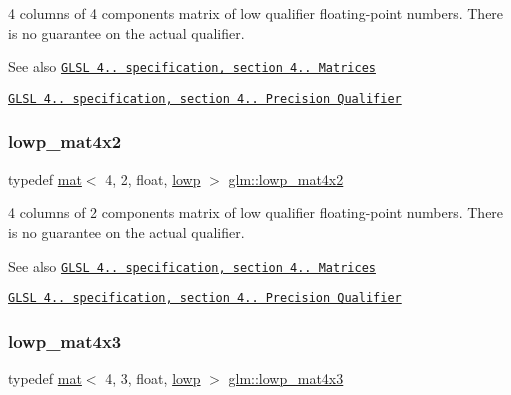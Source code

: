 4 columns of 4 components matrix of low qualifier floating-\/point numbers. There is no guarantee on the actual qualifier.

\begin{DoxySeeAlso}{See also}
\href{http://www.opengl.org/registry/doc/GLSLangSpec.4.20.8.pdf}{\tt G\+L\+SL 4.. specification, section 4.. Matrices} 

\href{http://www.opengl.org/registry/doc/GLSLangSpec.4.20.8.pdf}{\tt G\+L\+SL 4.. specification, section 4.. Precision Qualifier} 
\end{DoxySeeAlso}
\mbox{\label{group__core__precision_gacd6c35b61e9de6ad39767ea58660a602}} 
\subsubsection{\texorpdfstring{lowp\+\_\+mat4x2}{lowp\_mat4x2}}
{\footnotesize\ttfamily typedef \mbox{\hyperlink{structglm_1_1mat}{mat}}$<$ 4, 2, float, \mbox{\hyperlink{namespaceglm_a36ed105b07c7746804d7fdc7cc90ff25ae161af3fc695e696ce3bf69f7332bc2d}{lowp}} $>$ \mbox{\hyperlink{group__core__precision_gacd6c35b61e9de6ad39767ea58660a602}{glm\+::lowp\+\_\+mat4x2}}}

4 columns of 2 components matrix of low qualifier floating-\/point numbers. There is no guarantee on the actual qualifier.

\begin{DoxySeeAlso}{See also}
\href{http://www.opengl.org/registry/doc/GLSLangSpec.4.20.8.pdf}{\tt G\+L\+SL 4.. specification, section 4.. Matrices} 

\href{http://www.opengl.org/registry/doc/GLSLangSpec.4.20.8.pdf}{\tt G\+L\+SL 4.. specification, section 4.. Precision Qualifier} 
\end{DoxySeeAlso}
\mbox{\label{group__core__precision_ga23926fa6809eae2c18451a1a7b4dd6a8}} 
\subsubsection{\texorpdfstring{lowp\+\_\+mat4x3}{lowp\_mat4x3}}
{\footnotesize\ttfamily typedef \mbox{\hyperlink{structglm_1_1mat}{mat}}$<$ 4, 3, float, \mbox{\hyperlink{namespaceglm_a36ed105b07c7746804d7fdc7cc90ff25ae161af3fc695e696ce3bf69f7332bc2d}{lowp}} $>$ \mbox{\hyperlink{group__core__precision_ga23926fa6809eae2c18451a1a7b4dd6a8}{glm\+::lowp\+\_\+mat4x3}}}

